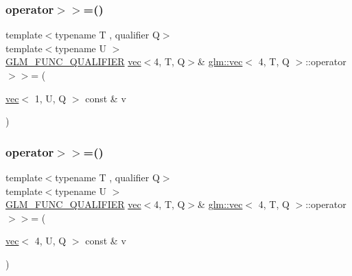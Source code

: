 \mbox{\label{structglm_1_1vec_3_014_00_01_t_00_01_q_01_4_a83a91fd4b81cc0335d4310a2aed2f713}} 
\subsubsection{\texorpdfstring{operator$>$$>$=()}{operator>>=()}\hspace{0.1cm}{\footnotesize\ttfamily [5/6]}}
{\footnotesize\ttfamily template$<$typename T , qualifier Q$>$ \\
template$<$typename U $>$ \\
\mbox{\hyperlink{setup_8hpp_a33fdea6f91c5f834105f7415e2a64407}{G\+L\+M\+\_\+\+F\+U\+N\+C\+\_\+\+Q\+U\+A\+L\+I\+F\+I\+ER}} \mbox{\hyperlink{structglm_1_1vec}{vec}}$<$4, T, Q$>$\& \mbox{\hyperlink{structglm_1_1vec}{glm\+::vec}}$<$ 4, T, Q $>$\+::operator$>$$>$= (\begin{DoxyParamCaption}\item[{\mbox{\hyperlink{structglm_1_1vec}{vec}}$<$ 1, U, Q $>$ const \&}]{v }\end{DoxyParamCaption})}

\mbox{\label{structglm_1_1vec_3_014_00_01_t_00_01_q_01_4_a44ce6a7a24c6f0b24eee2c09ae28796b}} 
\subsubsection{\texorpdfstring{operator$>$$>$=()}{operator>>=()}\hspace{0.1cm}{\footnotesize\ttfamily [6/6]}}
{\footnotesize\ttfamily template$<$typename T , qualifier Q$>$ \\
template$<$typename U $>$ \\
\mbox{\hyperlink{setup_8hpp_a33fdea6f91c5f834105f7415e2a64407}{G\+L\+M\+\_\+\+F\+U\+N\+C\+\_\+\+Q\+U\+A\+L\+I\+F\+I\+ER}} \mbox{\hyperlink{structglm_1_1vec}{vec}}$<$4, T, Q$>$\& \mbox{\hyperlink{structglm_1_1vec}{glm\+::vec}}$<$ 4, T, Q $>$\+::operator$>$$>$= (\begin{DoxyParamCaption}\item[{\mbox{\hyperlink{structglm_1_1vec}{vec}}$<$ 4, U, Q $>$ const \&}]{v }\end{DoxyParamCaption})}

